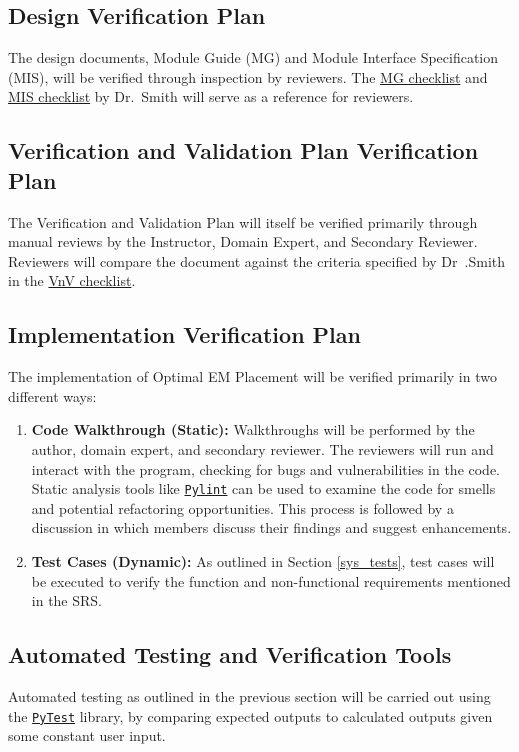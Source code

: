 \documentclass[12pt, titlepage]{article}
\begin{document}
\subsection{Design Verification Plan}
The design documents, Module Guide (MG) and Module Interface Specification (MIS), will be verified through inspection by reviewers. The \href{https://github.com/husseinsd1/optimal-em-arrangement/blob/main/docs/Checklists/MG-Checklist.pdf}{MG checklist} and \href{https://github.com/husseinsd1/optimal-em-arrangement/blob/main/docs/Checklists/MIS-Checklist.pdf}{MIS checklist} by Dr.~Smith will serve as a reference for reviewers. 

\subsection{Verification and Validation Plan Verification Plan}
The Verification and Validation Plan will itself be verified primarily through manual reviews by the Instructor, Domain Expert, and Secondary Reviewer. Reviewers will compare the document against the criteria specified by Dr~.Smith in the \href{https://github.com/husseinsd1/optimal-em-arrangement/blob/main/docs/Checklists/VnV-Checklist.pdf}{VnV checklist}.

\subsection{Implementation Verification Plan}
The implementation of Optimal EM Placement will be verified primarily in two different ways:
\begin{enumerate}
  \item \textbf{Code Walkthrough (Static): }Walkthroughs will be performed by the author, domain expert, and secondary reviewer. The reviewers will run and interact with the program, checking for bugs and vulnerabilities in the code. Static analysis tools like \href{https://github.com/pylint-dev/pylint}{\texttt{Pylint}} can be used to examine the code for smells and potential refactoring opportunities. This process is followed by a discussion in which members discuss their findings and suggest enhancements.  
  \item \textbf{Test Cases (Dynamic): }As outlined in Section \ref{sys_tests}, test cases will be executed to verify the function and non-functional requirements mentioned in the SRS. 
\end{enumerate}

\subsection{Automated Testing and Verification Tools} \label{ver_tools}
Automated testing as outlined in the previous section will be carried out using the \href{https://docs.pytest.org/en/stable/}{\texttt{PyTest}} library, by comparing expected outputs to calculated outputs given some constant user input. 
\end{document}
